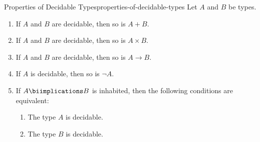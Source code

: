 \begin{proposition}{Properties of Decidable Types}{properties-of-decidable-types}%
    Let $A$ and $B$ be types.
    \begin{enumerate}
        \item\label{properties-of-decidable-types-decidability-of-dependent-pairs}If $A$ and $B$ are decidable, then so is $A+B$.
        \item\label{properties-of-decidable-types-decidability-of-products}If $A$ and $B$ are decidable, then so is $A\times B$.
        \item\label{properties-of-decidable-types-decidability-of-function-types}If $A$ and $B$ are decidable, then so is $A\to B$.
        \item\label{properties-of-decidable-types-decidability-of-negations-of-types}If $A$ is decidable, then so is $\neg A$.
        \item\label{properties-of-decidable-types-interaction-with-bi-implications}If $A\biimplications B$ is inhabited, then the following conditions are equivalent:
            \begin{enumerate}
                \item\label{properties-of-decidable-types-interaction-with-bi-implications-a}The type $A$ is decidable.
                \item\label{properties-of-decidable-types-interaction-with-bi-implications-b}The type $B$ is decidable.
            \end{enumerate}
    \end{enumerate}
\end{proposition}
